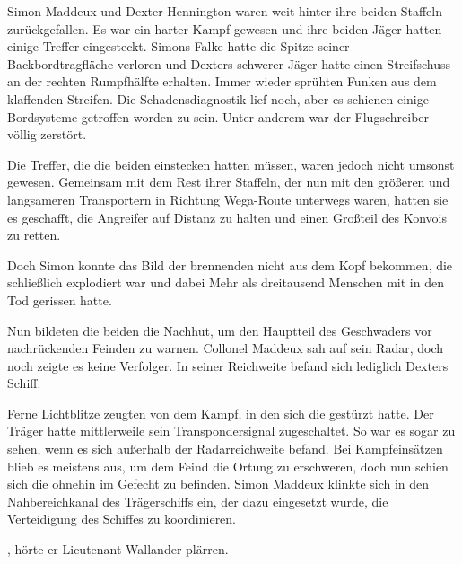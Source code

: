 Simon Maddeux und Dexter Hennington waren weit hinter ihre beiden Staffeln zurückgefallen. Es war ein harter Kampf gewesen und ihre beiden Jäger hatten einige Treffer eingesteckt. Simons Falke hatte die Spitze seiner Backbordtragfläche verloren und Dexters schwerer Jäger hatte einen Streifschuss an der rechten Rumpfhälfte erhalten. Immer wieder sprühten Funken aus dem klaffenden Streifen. Die Schadensdiagnostik lief noch, aber es schienen einige Bordsysteme getroffen worden zu sein. Unter anderem war der Flugschreiber völlig zerstört.

\par

Die Treffer, die die beiden einstecken hatten müssen, waren jedoch nicht umsonst gewesen. Gemeinsam mit dem Rest ihrer Staffeln, der nun mit den größeren und langsameren Transportern in Richtung Wega-Route unterwegs waren, hatten sie es geschafft, die Angreifer auf Distanz zu halten und einen Großteil des Konvois zu retten.

\par

Doch Simon konnte das Bild der brennenden  nicht aus dem Kopf bekommen, die schließlich explodiert war und dabei Mehr als dreitausend Menschen mit in den Tod gerissen hatte.

\par

Nun bildeten die beiden die Nachhut, um den Hauptteil des Geschwaders vor nachrückenden Feinden zu warnen. Collonel Maddeux sah auf sein Radar, doch noch zeigte es keine Verfolger. In seiner Reichweite befand sich lediglich Dexters Schiff.

\par

Ferne Lichtblitze zeugten von dem Kampf, in den sich die  gestürzt hatte. Der Träger hatte mittlerweile sein Transpondersignal zugeschaltet. So war es sogar zu sehen, wenn es sich außerhalb der Radarreichweite befand. Bei Kampfeinsätzen blieb es meistens aus, um dem Feind die Ortung zu erschweren, doch nun schien sich die  ohnehin im Gefecht zu befinden. Simon Maddeux klinkte sich in den Nahbereichkanal des Trägerschiffs ein, der dazu eingesetzt wurde, die Verteidigung des Schiffes zu koordinieren.

\par

, hörte er Lieutenant Wallander plärren.

